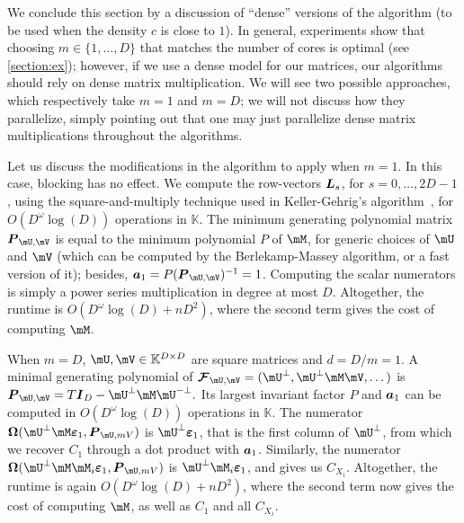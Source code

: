 \documentclass[12pt]{article}
\newcommand{\mat}[1]{\bm{\MakeUppercase{#1}}} %
\newcommand{\row}[1]{\bm{\MakeLowercase{#1}}} %
\newcommand{\col}[1]{\bm{\MakeLowercase{#1}}} %
\newcommand{\seq}{\mat{\mathcal{F}}} %
\newcommand{\minpoly}{P}
\def\K{\mathbb{K}}
\def\K {\ensuremath{\mathbb{K}}}
\begin{document}
\medskip

We conclude this section by a discussion of ``dense'' versions of the
algorithm (to be used when the density $c$ is close to $1$). In
general, experiments show that choosing $m \in\{1,\dots, D\}$ that
matches the number of cores is optimal (see \cref{section:ex});
however, if we use a dense model for our matrices, our algorithms
should rely on dense matrix multiplication. We will see two possible
approaches, which respectively take $m=1$ and $m=D$; we will not
discuss how they parallelize, simply pointing out that one may just
parallelize dense matrix multiplications throughout the algorithms.

Let us discuss the modifications in the algorithm to apply when
$m=1$. In this case, blocking has no effect. We compute the
row-vectors $\mat{L}_s$, for $s=0,\dots,2D-1$, using the
square-and-multiply technique used in Keller-Gehrig's
algorithm~\cite{Keller85}, for $O(D^\omega \log(D))$ operations in
$\K$. The minimum generating polynomial matrix $\mat{P}_{\mU,\mV}$ is
equal to the minimum polynomial $\minpoly$ of $\mM$, for generic
choices of $\mU$ and $\mV$ (which can be computed by the
Berlekamp-Massey algorithm, or a fast version of it); besides,
$\row{a}_1 = P (\mat{P}_{\mU,\mV})^{-1} = 1$. Computing the scalar
numerators is simply a power series multiplication in degree at most
$D$. Altogether, the runtime is $O(D^{\omega} \log(D) + nD^2)$, 
where the second term gives the cost of computing $\mM$.


When $m = D$, $\mU,\mV \in \mathbb{K}^{D \times D}$ are square
matrices and $d = D/m = 1$. A minimal generating polynomial of
$\seq_{\mU,\mV} = (\mU^\perp, \mU^\perp\mM\mV,\dots)$ is
$\mat{P}_{\mU,\mV} = T \mat{I}_D - \mU^\perp\mM\mU^{-\perp}.$ Its
largest invariant factor $\minpoly$ and $\row{a}_1$ can be computed in
$O(D^\omega \log(D))$ operations in $\K$.  The numerator
$\mat{\Omega}(\mU^\perp \mM \col{\varepsilon}_1, \mat{P}_{\mU,mV})$ is
$\mU^\perp \col{\varepsilon}_1$, that is the first column of
$\mU^\perp$, from which we recover $C_1$ through a dot product with
$\row{a}_1$. Similarly, the numerator $\mat{\Omega}(\mU^\perp \mM
\mM_i \col{\varepsilon}_1, \mat{P}_{\mU,mV})$ is $\mU^\perp \mM_i
\col{\varepsilon}_1$, and gives us $C_{X_i}$. Altogether, 
the runtime is again  $O(D^{\omega} \log(D) + nD^2)$, 
where the second term now gives the cost of computing $\mM$,
as well as $C_1$ and all $C_{X_i}$.



\end{document}
